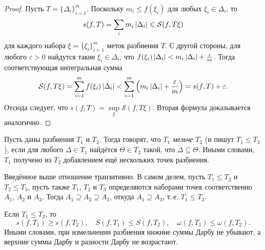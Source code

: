 \begin{proof}
    Пусть $T = \{\Delta_i\}_{i = 1}^m$. Поскольку $m_i \leqslant f(\xi_i)$ для любых $\xi_i \in \Delta_i$, то
    \[
        s(f, T) = \sum_im_i\left\lvert\Delta_i\right\rvert \leqslant \mathcal{S}(f, T\xi)
    \]
    для каждого набора $\xi = \{\xi_i\}_{i = 1}^m$ меток разбиения $T$. С другой стороны, для любого $\varepsilon > 0$ найдутся такие $\xi_i \in \Delta_i$, что $f(\xi_i)\left\lvert\Delta_i\right\rvert < m_i\left\lvert\Delta_i\right\rvert + \frac{\varepsilon}{m}$. Тогда соответствующая интегральная сумма
    \[
        \mathcal{S}(f, T\xi) = \sum_{i = 1}^mf(\xi_i)\left\lvert\Delta_i\right\rvert < \sum_{i = 1}^m\left(m_i\left\lvert\Delta_i\right\rvert + \frac{\varepsilon}{m}\right) = s(f, T) + \varepsilon.
    \]
    Отсюда следует, что $s(f, T) = \sup\limits_{\xi}\mathcal{S}(f, T\xi)$. Вторая формула доказывается аналогично.
\end{proof}

\begin{definition}
    Пусть даны разбиения $T_1$ и $T_2$. Тогда говорят, что $T_1$ \textit{мельче} $T_2$ (и пишут $T_1 \leqslant T_2$), если для любого $\Delta \in T_1$ найдётся $\Theta \in T_2$ такой, что $\Delta \subseteq \Theta$. Иными словами, $T_1$ получено из $T_2$ добавлением ещё нескольких точек разбиения.
\end{definition}

Введённое выше отношение транзитивно. В самом делем, пусть $T_1 \leqslant T_2$ и $T_2 \leqslant T_3$, пусть также $T_1$, $T_2$ и $T_3$ определяются наборами точек соответственно $A_1$, $A_2$ и $A_3$. Тогда $A_1 \supseteq A_2 \supseteq A_3$, откуда $A_1 \supseteq A_3$, т.\,е. $T_1 \leqslant T_3$.

\begin{lemma}
    Если $T_1 \leqslant T_2$, то
    \[
        s(f, T_1) \geqslant s(f, T_2),\quad S(f, T_1) \leqslant S(f, T_2),\quad \omega(f, T_1) \leqslant \omega(f, T_2).
    \]
    Иными словами, при измельчении разбиения нижние суммы Дарбу не убывают, а верхние суммы Дарбу и разности Дарбу не возрастают.
\end{lemma}

